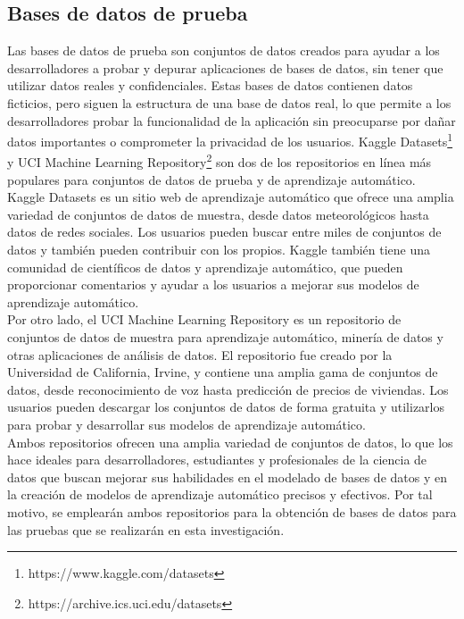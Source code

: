 \subsection{Bases de datos de prueba}
Las bases de datos de prueba son conjuntos de datos creados para ayudar a los desarrolladores a probar y depurar aplicaciones de bases de datos, sin tener que utilizar datos reales y confidenciales. Estas bases de datos contienen datos ficticios, pero siguen la estructura de una base de datos real, lo que permite a los desarrolladores probar la funcionalidad de la aplicación sin preocuparse por dañar datos importantes o comprometer la privacidad de los usuarios. Kaggle Datasets\footnote{https://www.kaggle.com/datasets} y UCI Machine Learning Repository\footnote{https://archive.ics.uci.edu/datasets} son dos de los repositorios en línea más populares para conjuntos de datos de prueba y de aprendizaje automático. \\
Kaggle Datasets es un sitio web de aprendizaje automático que ofrece una amplia variedad de conjuntos de datos de muestra, desde datos meteorológicos hasta datos de redes sociales. Los usuarios pueden buscar entre miles de conjuntos de datos y también pueden contribuir con los propios. Kaggle también tiene una comunidad de científicos de datos y aprendizaje automático, que pueden proporcionar comentarios y ayudar a los usuarios a mejorar sus modelos de aprendizaje automático. \\
Por otro lado, el UCI Machine Learning Repository es un repositorio de conjuntos de datos de muestra para aprendizaje automático, minería de datos y otras aplicaciones de análisis de datos. El repositorio fue creado por la Universidad de California, Irvine, y contiene una amplia gama de conjuntos de datos, desde reconocimiento de voz hasta predicción de precios de viviendas. Los usuarios pueden descargar los conjuntos de datos de forma gratuita y utilizarlos para probar y desarrollar sus modelos de aprendizaje automático. \\
Ambos repositorios ofrecen una amplia variedad de conjuntos de datos, lo que los hace ideales para desarrolladores, estudiantes y profesionales de la ciencia de datos que buscan mejorar sus habilidades en el modelado de bases de datos y en la creación de modelos de aprendizaje automático precisos y efectivos. Por tal motivo, se emplearán ambos repositorios para la obtención de bases de datos para las pruebas que se realizarán en esta investigación.

